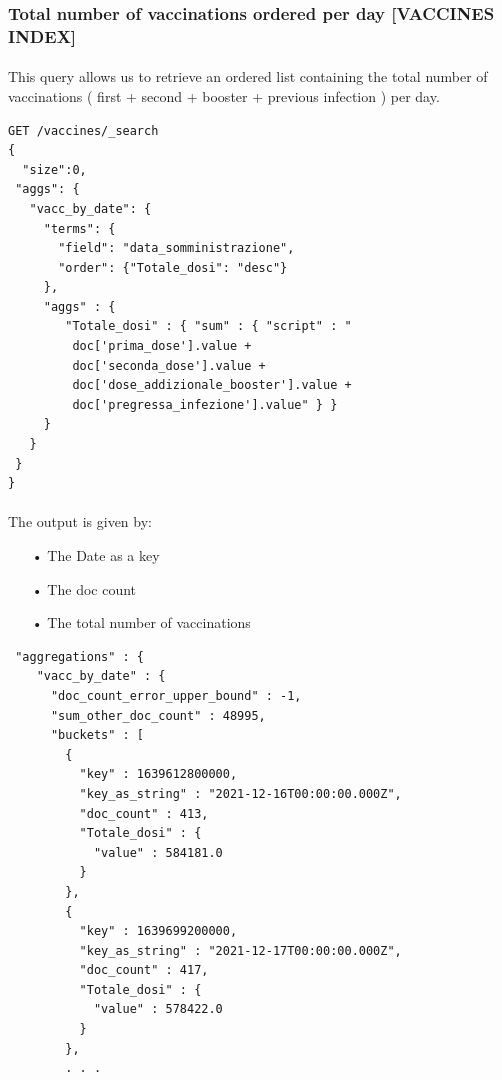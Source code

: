 \documentclass[a4paper,12pt]{article}
\begin{document}
\subsubsection{Total number of vaccinations ordered per day [VACCINES INDEX]}
\paragraph{} This query allows us to retrieve an ordered list containing the total number of vaccinations ( first + second + booster + previous infection ) per day.
\begin{tcolorbox}[colback=green!5!white,colframe=green!75!black,title=QUERY]
\begin{verbatim}
GET /vaccines/_search
{
  "size":0,
 "aggs": {
   "vacc_by_date": {
     "terms": {
       "field": "data_somministrazione",
       "order": {"Totale_dosi": "desc"}
     },
     "aggs" : {
        "Totale_dosi" : { "sum" : { "script" : "
         doc['prima_dose'].value +
         doc['seconda_dose'].value + 
         doc['dose_addizionale_booster'].value +
         doc['pregressa_infezione'].value" } }
     }
   }
 }
}
\end{verbatim}
\end{tcolorbox}
\paragraph{} The output is given by: 
\begin{itemize}[noitemsep]
\item[•] The Date as a key
\item[•] The doc count
\item[•] The total number of vaccinations
\end{itemize}
\begin{tcolorbox}[colback=red!5!white,colframe=red!75!black,title=OUTPUT]
\begin{verbatim}
 "aggregations" : {
    "vacc_by_date" : {
      "doc_count_error_upper_bound" : -1,
      "sum_other_doc_count" : 48995,
      "buckets" : [
        {
          "key" : 1639612800000,
          "key_as_string" : "2021-12-16T00:00:00.000Z",
          "doc_count" : 413,
          "Totale_dosi" : {
            "value" : 584181.0
          }
        },
        {
          "key" : 1639699200000,
          "key_as_string" : "2021-12-17T00:00:00.000Z",
          "doc_count" : 417,
          "Totale_dosi" : {
            "value" : 578422.0
          }
        },
        . . .
\end{verbatim}
\end{tcolorbox}
\clearpage
\end{document}
